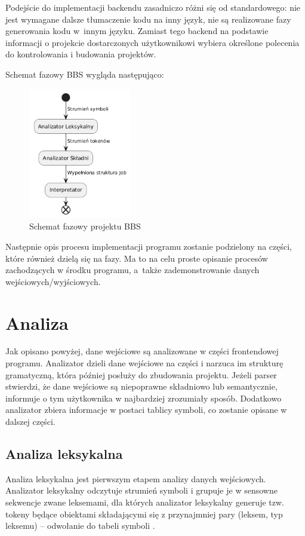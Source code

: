 Podejście do implementacji backendu zasadniczo różni się od standardowego: nie jest wymagane dalsze tłumaczenie kodu na inny język, nie są realizowane fazy generowania kodu w~innym języku. Zamiast tego backend na podstawie informacji o projekcie dostarczonych użytkownikowi wybiera określone polecenia do kontrolowania i budowania projektów.

Schemat fazowy BBS wygląda następująco:

\begin{figure}[h]
    \centering
    \includegraphics[width=0.4\textwidth]{Images/phases.png}
    \caption{Schemat fazowy projektu BBS}
\end{figure}

Następnie opis procesu implementacji programu zostanie podzielony na części, które również dzielą się na fazy. Ma to na celu proste opisanie procesów zachodzących w środku programu, a~także zademonstrowanie danych wejściowych/wyjściowych.

\section{Analiza}
Jak opisano powyżej, dane wejściowe są analizowane w części frontendowej programu. Analizator dzieli dane wejściowe na części i narzuca im strukturę gramatyczną, która później posłuży do zbudowania projektu. Jeżeli parser stwierdzi, że dane wejściowe są niepoprawne składniowo lub semantycznie, informuje o tym użytkownika w najbardziej zrozumiały sposób. Dodatkowo analizator zbiera informacje w postaci tablicy symboli, co zostanie opisane w dalszej części.

\subsection{Analiza leksykalna}
Analiza leksykalna jest pierwszym etapem analizy danych wejściowych. Analizator leksykalny odczytuje strumień symboli i grupuje je w sensowne sekwencje zwane leksemami, dla których analizator leksykalny generuje tzw. tokeny będące obiektami składającymi się z przynajmniej pary (leksem, typ leksemu) -- odwołanie do tabeli symboli \cite{compilers}.

